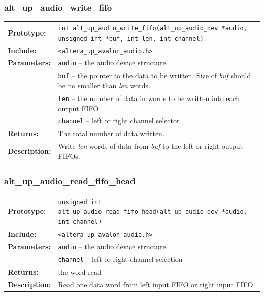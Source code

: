 \subsubsection{alt\_up\_audio\_write\_fifo}
\begin{tabular}[ht]{lp{11cm}}
	\textbf{Prototype:}
	&
	\texttt{int alt\_up\_audio\_write\_fifo(alt\_up\_audio\_dev *audio, unsigned int *buf, int len, int channel)} 
	\\
	\textbf{Include:}
	&
	{\tt <altera\_up\_avalon\_audio.h>}
	\\
	{\textbf{Parameters:}}
	&
	\texttt{{audio}}
	 -- the audio device structure 
	\\
	&
	\texttt{{buf}}
	 -- the pointer to the data to be written. Size of {\it buf} should be no smaller than {\it len} words. 
	\\
	&
	\texttt{{len}}
	 -- the number of data in words to be written into each output FIFO 
	\\
	&
	\texttt{{channel}}
	 -- left or right channel selector 
	\\
	\textbf{Returns:}
	& The total number of data written.
	\\
	\textbf{Description:}
	& Write {\it len} words of data from {\it buf} to the left or right output FIFOs.\\
\end{tabular}
\vfill

\subsubsection{alt\_up\_audio\_read\_fifo\_head}
\begin{tabular}[ht]{lp{11cm}}
	\textbf{Prototype:}
	&
	\texttt{unsigned int alt\_up\_audio\_read\_fifo\_head(alt\_up\_audio\_dev *audio, int channel)} 
	\\
	\textbf{Include:}
	&
	{\tt <altera\_up\_avalon\_audio.h>}
	\\
	{\textbf{Parameters:}}
	&
	\texttt{{audio}}
	 -- the audio device structure 
	\\
	&
	\texttt{{channel}}
	 -- left or right channel selection 
	\\
	\textbf{Returns:}
	& the word read
	\\
	\textbf{Description:}
	& Read one data word from left input FIFO or right input FIFO.\\
\end{tabular}
\vfill


